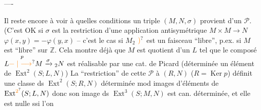 \noindent ----

 Il reste encore à voir à quelles conditions un triple $(M,N,\sigma)$ provient d'un $\mathscr P$. 
(C'est OK si $\sigma$ est la restriction d'une application  antisymétrique $M\times M\longrightarrow N$ $\varphi(x,y)=-\varphi(y,x)$ -- c'est le cas si $M_2$  $\unsure{)}$ est un faisceau ``libre'', p.ex. si $M$ est ``libre'' sur $\mathbb Z$. Cela montre déjà que $M$ est quotient d'un $L$ tel que le composé $L\overset{p}{\unsure{\relbar|\longrightarrow}}M\xrightarrow{\sigma}{}_2N$ est réalisable par une cat. de Picard  (déterminée  un élément de $\operatorname{Ext}^2(S;L,N)$) La ``restriction'' de cette $\mathscr P$ à $(R,N)$ ($R=\operatorname{Ker}p$) définit une classe ds $\operatorname{Ext}^2(S;R,N)$ déterminée mod images d'éléments de $\operatorname{Ext}^{\unsure{2}}(S;L,N)$ donc son image  ds $\operatorname{Ext}^3(S;M,N)$ est can. déterminée, et elle est nulle ssi l'on
